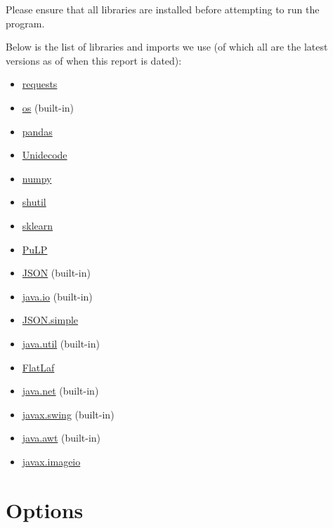 \documentclass[12pt, a4paper, oneside]{book}
\numberwithin{equation}{section}
\begin{document}
Please ensure that all libraries are installed before attempting to run the program.

Below is the list of libraries and imports we use (of which all are the latest versions as of when this report is dated):

\begin{itemize}
  \item \href{https://pypi.org/project/requests/}{requests}
  \item \href{https://docs.python.org/3/library/os.html}{os} (built-in)
  \item \href{https://pandas.pydata.org/docs/getting_started/install.html}{pandas}
  \item \href{https://pypi.org/project/Unidecode/}{Unidecode}
  \item \href{https://pypi.org/project/numpy/}{numpy}
  \item \href{https://pypi.org/project/pytest-shutil/}{shutil}
  \item \href{https://pypi.org/project/scikit-learn/}{sklearn}
  \item \href{https://pypi.org/project/PuLP/}{PuLP}
  \item \href{https://www.json.org/json-en.html}{JSON} (built-in)
  \item \href{https://docs.oracle.com/javase/7/docs/api/java/io/package-summary.html}{java.io} (built-in)
  \item \href{https://mkyong.com/java/json-simple-example-read-and-write-json/}{JSON.simple}
  \item \href{https://docs.oracle.com/javase/8/docs/api/java/util/package-summary.html}{java.util} (built-in)
  \item \href{https://www.formdev.com/flatlaf/}{FlatLaf}
  \item \href{https://docs.oracle.com/javase/7/docs/api/java/net/package-summary.html}{java.net} (built-in)
  \item \href{https://docs.oracle.com/javase/8/docs/api/javax/swing/package-summary.html}{javax.swing} (built-in)
  \item \href{https://docs.oracle.com/javase/7/docs/api/java/awt/package-summary.html}{java.awt} (built-in)
  \item \href{https://docs.oracle.com/javase/8/docs/api/javax/imageio/ImageIO.html}{javax.imageio}
\end{itemize}

\section{Options}\label{sec:7.2}
\end{document}
